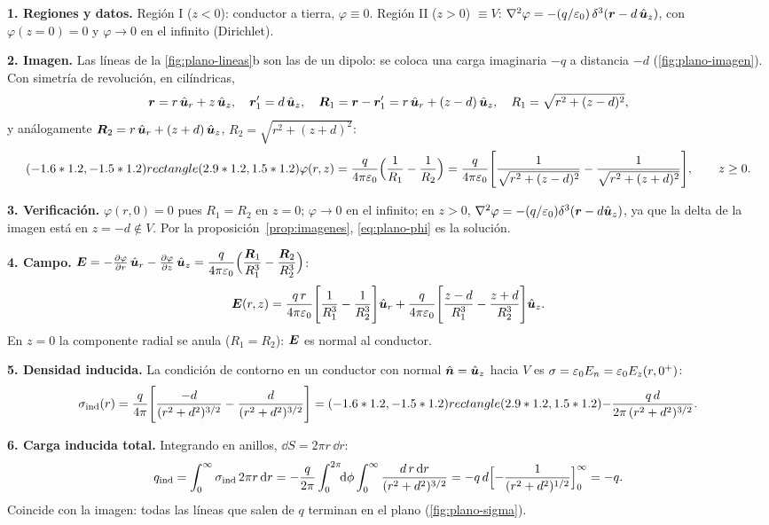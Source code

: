 \documentclass[11pt,a4paper,twoside]{article}
\begin{document}
\begin{resolucion}
\textbf{1. Regiones y datos.} Región I ($z<0$): conductor a tierra, $\varphi\equiv0$.
Región II ($z>0$) $\equiv V$: $\nabla^{2}\varphi=-(q/\varepsilon_{0})\,\delta^{3}(\bm{r}-d\,\hat{\bm{u}}_z)$, con
$\varphi(z=0)=0$ y $\varphi\to0$ en el infinito (Dirichlet).

\textbf{2. Imagen.} Las líneas de la \cref{fig:plano-lineas}b son las de un dipolo: se
coloca una carga imaginaria $-q$ a distancia $-d$ (\cref{fig:plano-imagen}). Con simetría de
revolución, en cilíndricas,
\[
  \bm{r}=r\,\hat{\bm{u}}_r+z\,\hat{\bm{u}}_z,\quad \bm{r}'_1=d\,\hat{\bm{u}}_z,\quad
  \bm{R}_1=\bm{r}-\bm{r}'_1=r\,\hat{\bm{u}}_r+(z-d)\,\hat{\bm{u}}_z,\quad R_1=\sqrt{r^{2}+(z-d)^{2}},
\]
y análogamente $\bm{R}_2=r\,\hat{\bm{u}}_r+(z+d)\,\hat{\bm{u}}_z$, $R_2=\sqrt{r^{2}+(z+d)^{2}}$:
\begin{equation}\label{eq:plano-phi}
  (-1.6*1.2,-1.5*1.2) rectangle (2.9*1.2,1.5*1.2){\varphi(r,z)=\frac{q}{4\pi\varepsilon_{0}}\Bigl(\frac1{R_1}-\frac1{R_2}\Bigr)
  =\frac{q}{4\pi\varepsilon_{0}}\Biggl[\frac{1}{\sqrt{r^{2}+(z-d)^{2}}}-\frac{1}{\sqrt{r^{2}+(z+d)^{2}}}\Biggr],\qquad z\ge0.}
\end{equation}

\textbf{3. Verificación.} $\varphi(r,0)=0$ pues $R_1=R_2$ en $z=0$; $\varphi\to0$ en el
infinito; en $z>0$, $\nabla^{2}\varphi=-(q/\varepsilon_{0})\delta^{3}(\bm{r}-d\hat{\bm{u}}_z)$, ya que la delta de la
imagen está en $z=-d\notin V$. Por la proposición~\ref{prop:imagenes}, \eqref{eq:plano-phi} es la
solución.

\textbf{4. Campo.}
$\bm{E}=-\frac{\partial \varphi}{\partial r}\,\hat{\bm{u}}_r-\frac{\partial \varphi}{\partial z}\,\hat{\bm{u}}_z
=\dfrac{q}{4\pi\varepsilon_{0}}\Bigl(\dfrac{\bm{R}_1}{R_1^{3}}-\dfrac{\bm{R}_2}{R_2^{3}}\Bigr)$:
\begin{equation}\label{eq:plano-E}
  \bm{E}(r,z)=\frac{q\,r}{4\pi\varepsilon_{0}}\Biggl[\frac{1}{R_1^{3}}-\frac{1}{R_2^{3}}\Biggr]\hat{\bm{u}}_r
  +\frac{q}{4\pi\varepsilon_{0}}\Biggl[\frac{z-d}{R_1^{3}}-\frac{z+d}{R_2^{3}}\Biggr]\hat{\bm{u}}_z .
\end{equation}
En $z=0$ la componente radial se anula ($R_1=R_2$): $\bm{E}$ es normal al conductor.

\textbf{5. Densidad inducida.} La condición de contorno en un conductor con normal
$\hat{\bm{n}}=\hat{\bm{u}}_z$ hacia $V$ es $\sigma=\varepsilon_{0} E_n=\varepsilon_{0} E_z(r,0^{+})$:
\begin{equation}\label{eq:plano-sigma}
  \sigma_{\mathrm{ind}}(r)=\frac{q}{4\pi}\Biggl[\frac{-d}{(r^{2}+d^{2})^{3/2}}-\frac{d}{(r^{2}+d^{2})^{3/2}}\Biggr]
  =(-1.6*1.2,-1.5*1.2) rectangle (2.9*1.2,1.5*1.2){-\frac{q\,d}{2\pi\,(r^{2}+d^{2})^{3/2}}.}
\end{equation}

\textbf{6. Carga inducida total.} Integrando en anillos, $\dd S=2\pi r\,\dd r$:
\[
  q_{\mathrm{ind}}=\int_0^{\infty}\sigma_{\mathrm{ind}}\,2\pi r\,\mathrm{d} r
  =-\frac{q}{2\pi}\int_0^{2\pi}\!\!\mathrm{d}\phi\int_0^{\infty}\frac{d\,r\,\mathrm{d} r}{(r^{2}+d^{2})^{3/2}}
  =-q\,d\Bigl[-\frac{1}{(r^{2}+d^{2})^{1/2}}\Bigr]_0^{\infty}=-q .
\]
Coincide con la imagen: todas las líneas que salen de $q$ terminan en el plano
(\cref{fig:plano-sigma}).


\end{resolucion}
\end{document}
